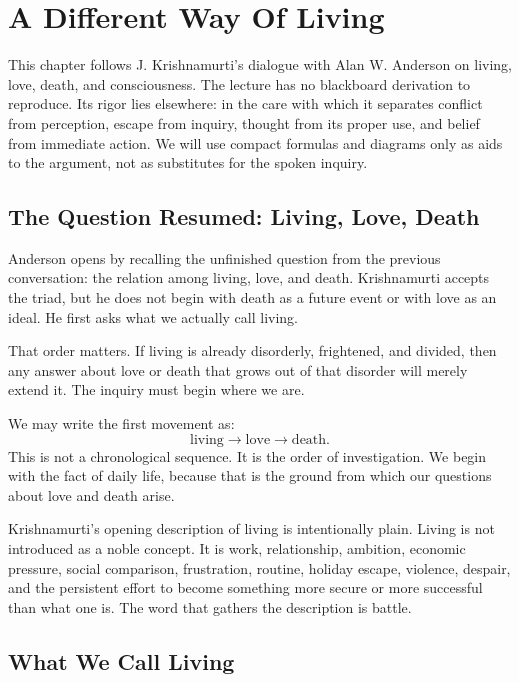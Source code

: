 \chapter{A Different Way Of Living}

This chapter follows J. Krishnamurti's dialogue with Alan W. Anderson on living, love, death, and consciousness. The lecture has no blackboard derivation to reproduce. Its rigor lies elsewhere: in the care with which it separates conflict from perception, escape from inquiry, thought from its proper use, and belief from immediate action. We will use compact formulas and diagrams only as aids to the argument, not as substitutes for the spoken inquiry.

\section{The Question Resumed: Living, Love, Death}

Anderson opens by recalling the unfinished question from the previous conversation: the relation among living, love, and death. Krishnamurti accepts the triad, but he does not begin with death as a future event or with love as an ideal. He first asks what we actually call living.

That order matters. If living is already disorderly, frightened, and divided, then any answer about love or death that grows out of that disorder will merely extend it. The inquiry must begin where we are.

We may write the first movement as:
\begin{equation}
\text{living} \longrightarrow \text{love} \longrightarrow \text{death}.
\end{equation}
This is not a chronological sequence. It is the order of investigation. We begin with the fact of daily life, because that is the ground from which our questions about love and death arise.

Krishnamurti's opening description of living is intentionally plain. Living is not introduced as a noble concept. It is work, relationship, ambition, economic pressure, social comparison, frustration, routine, holiday escape, violence, despair, and the persistent effort to become something more secure or more successful than what one is. The word that gathers the description is battle.

\section{What We Call Living}

